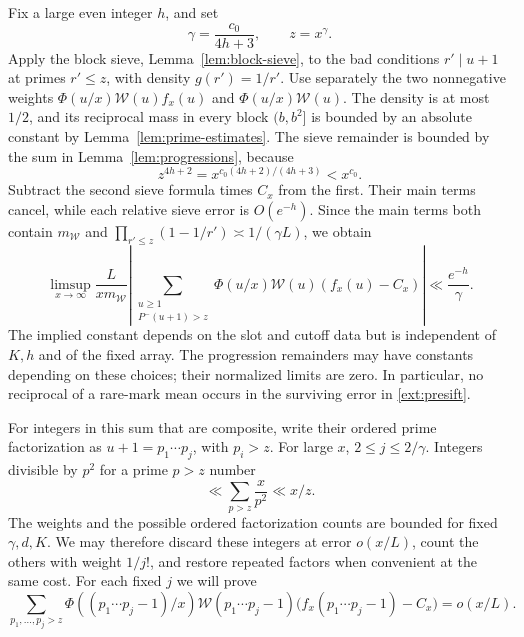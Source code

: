 Fix a large even integer $h$, and set
\begin{equation}\label{ext:sieve-parameters}
 \gamma=\frac{c_0}{4h+3},\qquad z=x^\gamma.
\end{equation}
Apply the block sieve, Lemma~\ref{lem:block-sieve}, to the bad
conditions $r'\mid u+1$ at primes $r'\leq z$, with density
$g(r')=1/r'$.  Use separately the two nonnegative weights
$\Phi(u/x)\mathcal W(u)f_x(u)$ and
$\Phi(u/x)\mathcal W(u)$.  The density is at most $1/2$, and
its reciprocal mass in every block $(b,b^2]$ is bounded by an
absolute constant by Lemma~\ref{lem:prime-estimates}.  The sieve
remainder is bounded by the sum in Lemma~\ref{lem:progressions},
because
\begin{equation}\label{ext:sieve-level}
 z^{4h+2}=x^{c_0(4h+2)/(4h+3)}<x^{c_0}.
\end{equation}
Subtract the second sieve formula times $C_x$ from the first.
Their main terms cancel, while each relative sieve error is
$O(e^{-h})$.  Since the main terms both contain
$m_{\mathcal W}$ and
$\prod_{r'\leq z}(1-1/r')\asymp1/(\gamma L)$, we obtain
\begin{equation}\label{ext:presift}
 \limsup_{x\to\infty}\frac{L}{xm_{\mathcal W}}
 \left|\sum_{\substack{u\geq1\\P^-(u+1)>z}}
    \Phi(u/x)\mathcal W(u)(f_x(u)-C_x)\right|
 \ll\frac{e^{-h}}{\gamma}.
\end{equation}
The implied constant depends on the slot and cutoff data but is
independent of $K,h$ and of the fixed array.  The progression
remainders may have constants depending on these choices; their
normalized limits are zero.  In particular, no reciprocal of a
rare-mark mean occurs in the surviving error in
\eqref{ext:presift}.

For integers in this sum that are composite, write their ordered
prime factorization as $u+1=p_1\cdots p_j$, with $p_i>z$.
For large $x$, $2\leq j\leq2/\gamma$.  Integers divisible by
$p^2$ for a prime $p>z$ number
\[
 \ll\sum_{p>z}\frac{x}{p^2}\ll x/z.
\]
The weights and the possible ordered factorization counts are
bounded for fixed $\gamma,d,K$.  We may therefore discard these
integers at error $o(x/L)$, count the others with weight $1/j!$,
and restore repeated factors when convenient at the same cost.
For each fixed $j$ we will prove
\begin{equation}\label{ext:composite-vanishing}
 \sum_{p_1,\ldots,p_j>z}
 \Phi((p_1\cdots p_j-1)/x)
 \mathcal W(p_1\cdots p_j-1)
 \bigl(f_x(p_1\cdots p_j-1)-C_x\bigr)=o(x/L).
\end{equation}

